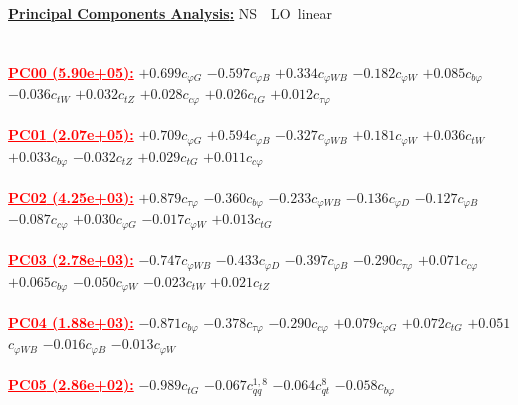 \documentclass{article}
\begin{document}
\noindent \underline{\bf{Principal Components Analysis}:} \rm NS\ \ LO\ linear\\ \\ \\
\noindent \textcolor{red}{\underline{\bf{PC00} (5.90e+05):}}
{$+0.699$}{\rm $c_{\varphi G}$}
{$-0.597$}{\rm $c_{\varphi B}$}
{$+0.334$}{\rm $c_{\varphi WB}$}
{$-0.182$}{\rm $c_{\varphi W}$}
{$+0.085$}{\rm $c_{b \varphi}$}
{$-0.036$}{\rm $c_{tW}$}
{$+0.032$}{\rm $c_{tZ}$}
{$+0.028$}{\rm $c_{c \varphi}$}
{$+0.026$}{\rm $c_{tG}$}
{$+0.012$}{\rm $c_{\tau \varphi}$}
 \nonumber \\ \nonumber \\
\noindent \textcolor{red}{\underline{\bf{PC01} (2.07e+05):}}
{$+0.709$}{\rm $c_{\varphi G}$}
{$+0.594$}{\rm $c_{\varphi B}$}
{$-0.327$}{\rm $c_{\varphi WB}$}
{$+0.181$}{\rm $c_{\varphi W}$}
{$+0.036$}{\rm $c_{tW}$}
{$+0.033$}{\rm $c_{b \varphi}$}
{$-0.032$}{\rm $c_{tZ}$}
{$+0.029$}{\rm $c_{tG}$}
{$+0.011$}{\rm $c_{c \varphi}$}
 \nonumber \\ \nonumber \\
\noindent \textcolor{red}{\underline{\bf{PC02} (4.25e+03):}}
{$+0.879$}{\rm $c_{\tau \varphi}$}
{$-0.360$}{\rm $c_{b \varphi}$}
{$-0.233$}{\rm $c_{\varphi WB}$}
{$-0.136$}{\rm $c_{\varphi D}$}
{$-0.127$}{\rm $c_{\varphi B}$}
{$-0.087$}{\rm $c_{c \varphi}$}
{$+0.030$}{\rm $c_{\varphi G}$}
{$-0.017$}{\rm $c_{\varphi W}$}
{$+0.013$}{\rm $c_{tG}$}
 \nonumber \\ \nonumber \\
\noindent \textcolor{red}{\underline{\bf{PC03} (2.78e+03):}}
{$-0.747$}{\rm $c_{\varphi WB}$}
{$-0.433$}{\rm $c_{\varphi D}$}
{$-0.397$}{\rm $c_{\varphi B}$}
{$-0.290$}{\rm $c_{\tau \varphi}$}
{$+0.071$}{\rm $c_{c \varphi}$}
{$+0.065$}{\rm $c_{b \varphi}$}
{$-0.050$}{\rm $c_{\varphi W}$}
{$-0.023$}{\rm $c_{tW}$}
{$+0.021$}{\rm $c_{tZ}$}
 \nonumber \\ \nonumber \\
\noindent \textcolor{red}{\underline{\bf{PC04} (1.88e+03):}}
{$-0.871$}{\rm $c_{b \varphi}$}
{$-0.378$}{\rm $c_{\tau \varphi}$}
{$-0.290$}{\rm $c_{c \varphi}$}
{$+0.079$}{\rm $c_{\varphi G}$}
{$+0.072$}{\rm $c_{tG}$}
{$+0.051$}{\rm $c_{\varphi WB}$}
{$-0.016$}{\rm $c_{\varphi B}$}
{$-0.013$}{\rm $c_{\varphi W}$}
 \nonumber \\ \nonumber \\
\noindent \textcolor{red}{\underline{\bf{PC05} (2.86e+02):}}
{$-0.989$}{\rm $c_{tG}$}
{$-0.067$}{\rm $c_{qq}^{1,8}$}
{$-0.064$}{\rm $c_{qt}^{8}$}
{$-0.058$}{\rm $c_{b \varphi}$}
\end{document}
